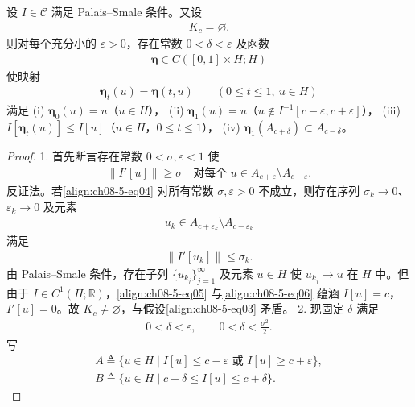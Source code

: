 \documentclass[../../main.tex]{subfiles}
\begin{document}
\begin{theorem}[形变定理]\label{theorem:ch08-5-1-形变定理}
设 $I\in\mathcal{C}$ 满足 Palais--Smale 条件。又设
\begin{align}
K_c=\varnothing .\label{align:ch08-5-eq03}
\end{align}
则对每个充分小的 $\varepsilon>0$，存在常数 $0<\delta<\varepsilon$ 及函数
\begin{align*}
\boldsymbol{\eta}\in C([0,1]\times H;H)
\end{align*}
使映射
\begin{align*}
\boldsymbol{\eta}_t(u)=\boldsymbol{\eta}(t,u)\qquad (0\leqslant t\leqslant 1,\ u\in H)
\end{align*}
满足
(i) $\boldsymbol{\eta}_0(u)=u$（$u\in H$），
(ii) $\boldsymbol{\eta}_1(u)=u$（$u\notin I^{-1}[c-\varepsilon,c+\varepsilon]$），
(iii) $I[\boldsymbol{\eta}_t(u)]\leqslant I[u]$（$u\in H$，$0\leqslant t\leqslant 1$），
(iv) $\boldsymbol{\eta}_1(A_{c+\delta})\subset A_{c-\delta}$。
\begin{proof}
1. 首先断言存在常数 $0<\sigma,\varepsilon<1$ 使
\begin{align}
\|I'[u]\|\geqslant\sigma\quad\text{对每个 }u\in A_{c+\varepsilon}\setminus A_{c-\varepsilon}.\label{align:ch08-5-eq04}
\end{align}
反证法。若\eqref{align:ch08-5-eq04} 对所有常数 $\sigma,\varepsilon>0$ 不成立，则存在序列 $\sigma_k\to 0$、$\varepsilon_k\to 0$ 及元素
\begin{align}
u_k\in A_{c+\varepsilon_k}\setminus A_{c-\varepsilon_k}\label{align:ch08-5-eq05}
\end{align}
满足
\begin{align}
\|I'[u_k]\|\leqslant\sigma_k.\label{align:ch08-5-eq06}
\end{align}
由 Palais--Smale 条件，存在子列 $\{u_{k_j}\}_{j=1}^\infty$ 及元素 $u\in H$ 使 $u_{k_j}\to u$ 在 $H$ 中。但由于 $I\in C^1(H;\mathbb{R})$，\eqref{align:ch08-5-eq05} 与\eqref{align:ch08-5-eq06} 蕴涵 $I[u]=c$，$I'[u]=0$。故 $K_c\neq\varnothing $，与假设\eqref{align:ch08-5-eq03} 矛盾。
2. 现固定 $\delta$ 满足
\begin{align}
0<\delta<\varepsilon,\qquad 0<\delta<\frac{\sigma^2}{2}.\label{align:ch08-5-eq07}
\end{align}
写
\begin{align*}
A\triangleq\{u\in H\mid I[u]\leqslant c-\varepsilon\text{ 或 }I[u]\geqslant c+\varepsilon\},\\
B\triangleq\{u\in H\mid c-\delta\leqslant I[u]\leqslant c+\delta\}.
\end{align*}

\end{proof}
\end{theorem}
\end{document}

